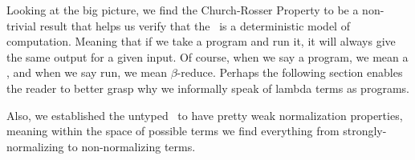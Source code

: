 Looking at the big picture, we find the Church-Rosser Property to be a non-trivial result that helps us verify that the \lcalc \ is a deterministic model of computation. Meaning that if we take a program and run it, it will always give the same output for a given input. Of course, when we say a program, we mean a \lterm, and when we say run, we mean $\beta$-reduce. Perhaps the following section enables the reader to better grasp why we informally speak of lambda terms as programs.

Also, we established the untyped \lcalc \ to have pretty weak normalization properties, meaning within the space of possible terms we find everything from strongly-normalizing to non-normalizing terms.



